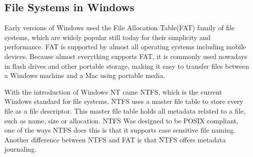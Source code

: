 \documentclass[10pt,serif,draftclsnofoot,onecolumn]{IEEEtran}
\begin{document}
	\subsection{File Systems in Windows}
	\par
	Early versions of Windows used the File Allocation Table(FAT) family of file systems, which are widely popular still today for their simplicity and performance\cite{18}. FAT is supported by almost all operating systems including mobile devices. Because almost everything supports FAT, it is commonly used nowadays in flash drives and other portable storage, making it easy to transfer files between a Windows machine and a Mac using portable media. 
	\newline
	\par
	With the introduction of Windows NT came NTFS, which is the current Windows standard for file systems\cite{18}. NTFS uses a master file table to store every file as a file descriptor. This master file table holds all metadata related to a file, such as name, size or allocation\cite{18}. NTFS Was designed to be POSIX compliant, one of the ways NTFS does this is that it supports case sensitive file naming\cite{19}. Another difference between NTFS and FAT is that NTFS offers metadata journaling.
	\newline
\end{document}
